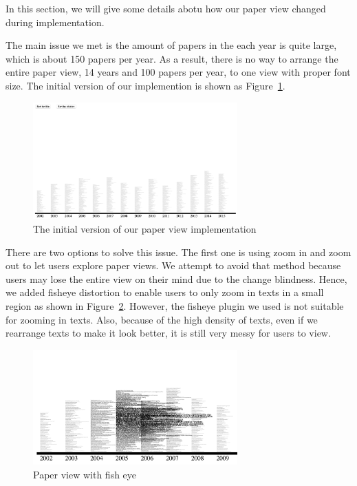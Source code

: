 In this section, we will give some details abotu how our paper view changed during implementation. 

The main issue we met is the amount of papers in the each year is quite large, which is about 150 papers per year. As a result, there is no way to arrange the entire paper view, 14 years and 100 papers per year, to one view with proper font size. The initial version of our implemention is shown as Figure~\ref{fig:pv_initial_version}.

\begin{figure}[h]			
	\centering
	\includegraphics[width=0.7\textwidth]{paper_view_initial_version}
	\caption{The initial version of our paper view implementation}
	\label{fig:pv_initial_version}
\end{figure} 

There are two options to solve this issue. The first one is using zoom in and zoom out to let users explore paper views. We attempt to avoid that method because users may lose the entire view on their mind due to the change blindness. Hence, we added fisheye distortion to enable users to only zoom in texts in a small region as shown in Figure~\ref{fig:pv_fisheye}. However, the fisheye plugin we used is not suitable for zooming in texts. Also, because of the high density of texts, even if we rearrange texts to make it look better, it is still very messy for users to view.

\begin{figure}[ht]			
	\centering
	\includegraphics[width=0.7\textwidth]{paper_view_fisheye}
	\caption{Paper view with fish eye}
	\label{fig:pv_fisheye}
\end{figure} 

